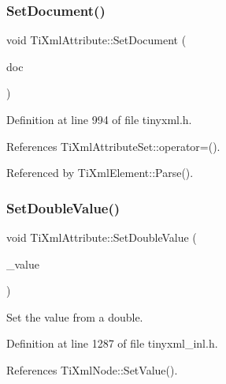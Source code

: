 \hypertarget{class_ti_xml_attribute_ac12a94d4548302afb12f488ba101f7d1}{}\label{class_ti_xml_attribute_ac12a94d4548302afb12f488ba101f7d1} 
\subsubsection{\texorpdfstring{Set\+Document()}{SetDocument()}}
{\footnotesize\ttfamily void Ti\+Xml\+Attribute\+::\+Set\+Document (\begin{DoxyParamCaption}\item[{\hyperlink{class_ti_xml_document}{Ti\+Xml\+Document} $\ast$}]{doc }\end{DoxyParamCaption})\hspace{0.3cm}{\ttfamily [inline]}}



Definition at line 994 of file tinyxml.\+h.



References Ti\+Xml\+Attribute\+Set\+::operator=().



Referenced by Ti\+Xml\+Element\+::\+Parse().

\hypertarget{class_ti_xml_attribute_a0316da31373496c4368ad549bf711394}{}\label{class_ti_xml_attribute_a0316da31373496c4368ad549bf711394} 
\subsubsection{\texorpdfstring{Set\+Double\+Value()}{SetDoubleValue()}}
{\footnotesize\ttfamily void Ti\+Xml\+Attribute\+::\+Set\+Double\+Value (\begin{DoxyParamCaption}\item[{double}]{\+\_\+value }\end{DoxyParamCaption})}



Set the value from a double. 



Definition at line 1287 of file tinyxml\+\_\+inl.\+h.



References Ti\+Xml\+Node\+::\+Set\+Value().

\hypertarget{class_ti_xml_attribute_a7e065df640116a62ea4f4b7da5449cc8}{}\label{class_ti_xml_attribute_a7e065df640116a62ea4f4b7da5449cc8} 
